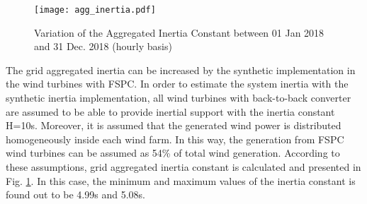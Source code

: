 \begin{figure}[h]
	\centering
	\texttt{[image: agg\_inertia.pdf]}
	\caption{Variation of the Aggregated Inertia Constant between 01 Jan 2018 and 31 Dec. 2018 (hourly basis)}
	\label{overallinertia}
\end{figure}
The grid aggregated inertia can be increased by the synthetic implementation in the wind turbines with FSPC. In order to estimate the system inertia with the synthetic inertia implementation, all wind turbines with back-to-back converter are assumed to be able to provide inertial support with the inertia constant H=10s. Moreover, it is assumed that the generated wind power is distributed homogeneously inside each wind farm. In this way, the generation from FSPC wind turbines can be assumed as 54\% of total wind generation. According to these assumptions, grid aggregated inertia constant is calculated and presented in Fig. \ref{overallinertia}. In this case, the minimum and maximum values of the inertia constant is found out to be 4.99s and 5.08s. \par
